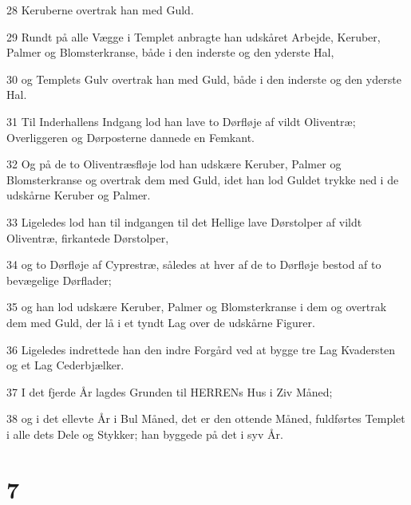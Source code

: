 \par 28 Keruberne overtrak han med Guld.
\par 29 Rundt på alle Vægge i Templet anbragte han udskåret Arbejde, Keruber, Palmer og Blomsterkranse, både i den inderste og den yderste Hal,
\par 30 og Templets Gulv overtrak han med Guld, både i den inderste og den yderste Hal.
\par 31 Til Inderhallens Indgang lod han lave to Dørfløje af vildt Oliventræ; Overliggeren og Dørposterne dannede en Femkant.
\par 32 Og på de to Oliventræsfløje lod han udskære Keruber, Palmer og Blomsterkranse og overtrak dem med Guld, idet han lod Guldet trykke ned i de udskårne Keruber og Palmer.
\par 33 Ligeledes lod han til indgangen til det Hellige lave Dørstolper af vildt Oliventræ, firkantede Dørstolper,
\par 34 og to Dørfløje af Cyprestræ, således at hver af de to Dørfløje bestod af to bevægelige Dørflader;
\par 35 og han lod udskære Keruber, Palmer og Blomsterkranse i dem og overtrak dem med Guld, der lå i et tyndt Lag over de udskårne Figurer.
\par 36 Ligeledes indrettede han den indre Forgård ved at bygge tre Lag Kvadersten og et Lag Cederbjælker.
\par 37 I det fjerde År lagdes Grunden til HERRENs Hus i Ziv Måned;
\par 38 og i det ellevte År i Bul Måned, det er den ottende Måned, fuldførtes Templet i alle dets Dele og Stykker; han byggede på det i syv År.

\chapter{7}

